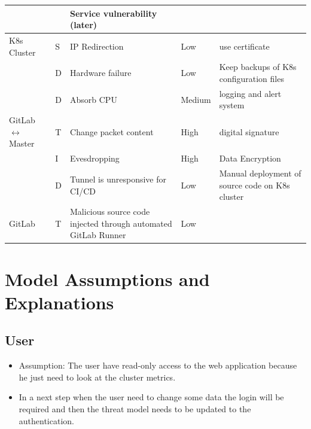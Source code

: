 \begin{longtable}[h!]{p{2.1cm} p{1.8cm} p{3cm} p{2cm} p{3.5cm}}
                        & & Service vulnerability (later) & & \\
    \hline
    K8s Cluster             
                        & S & IP Redirection & Low & use certificate \\
                        & D & Hardware failure & Low & Keep backups of K8s configuration files \\
                        & D & Absorb CPU & Medium & logging and alert system \\
    \hline
    GitLab \(\leftrightarrow\) Master 
                        & T & Change packet content & High & digital signature \\
                        & I & Evesdropping & High & Data Encryption \\
                        & D & Tunnel is unresponsive for CI/CD & Low & Manual deployment of source code on K8s cluster \\
    \hline
    GitLab
                        & T & Malicious source code injected through automated GitLab Runner & Low & \\
    \hline
\end{longtable}


\section{Model Assumptions and Explanations}

\subsection{User}
\begin{itemize}
    \item Assumption: The user have read-only access to the web application because he just need to look at the cluster metrics.
    \item In a next step when the user need to change some data the login will be required and then the threat model needs to be updated to the authentication.
\end{itemize}


